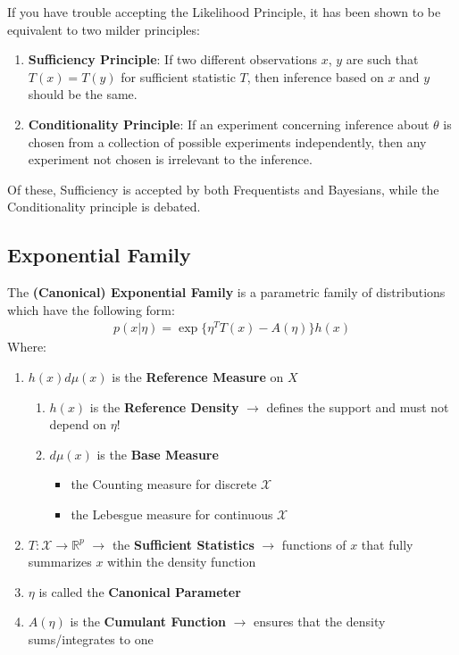 \documentclass[]{article}
\theoremstyle{mattstyle}
\theoremstyle{definition}
\begin{document}
If you have trouble accepting the Likelihood Principle, it has been shown to be equivalent to two milder principles:
\begin{enumerate}
	\item \textbf{Sufficiency Principle}: If two different observations $x$, $y$ are such that $T(x) = T(y)$ for sufficient statistic $T$, then inference based on $x$ and $y$ should be the same.
	\item \textbf{Conditionality Principle}: If an experiment concerning inference about $\theta$ is chosen from a collection of
	possible experiments independently, then any experiment not chosen is irrelevant to the inference.
\end{enumerate}

Of these, Sufficiency is accepted by both Frequentists and Bayesians, while the Conditionality principle is debated.

\newpage

\subsection{Exponential Family}\label{sec:expfam}

The \textbf{(Canonical) Exponential Family} is a parametric family of distributions which have the following form:
\begin{align}
p(x|\eta) = \exp\{ \eta^TT(x) - A(\eta)\}h(x)
\end{align}
Where:
\begin{enumerate}
	\item $h(x)d\mu(x)$ is the \textbf{Reference Measure} on $X$
	\begin{enumerate}
		\item $h(x)$ is the \textbf{Reference Density} $\rightarrow$ defines the support and must not depend on $\eta$!
		\item $d\mu(x)$ is the \textbf{Base Measure} 
		\begin{itemize}
			\item the Counting measure for discrete $\mathcal{X}$
			\item the Lebesgue measure for continuous $\mathcal{X}$
		\end{itemize}
	\end{enumerate}
	\item $T: \mathcal{X} \rightarrow \mathbb{R}^p$ $\rightarrow$ the \textbf{Sufficient Statistics} $\rightarrow$ functions of $x$ that fully summarizes $x$ within the density function
	\item $\eta$ is called the \textbf{Canonical Parameter}
	\item $A(\eta)$ is the \textbf{Cumulant Function} $\rightarrow$ ensures that the density sums/integrates to one
\end{enumerate}
\end{document}
